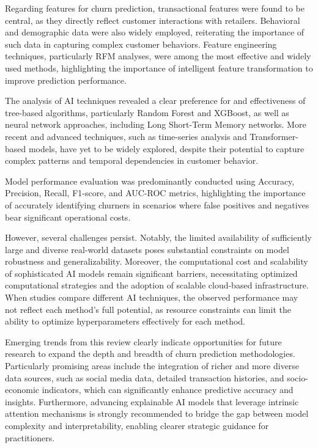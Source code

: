 \documentclass[preprint,12pt]{elsarticle}
\begin{document}
Regarding features for churn prediction, transactional features were found to be central, as they directly reflect customer interactions with retailers. Behavioral and demographic data were also widely employed, reiterating the importance of such data in capturing complex customer behaviors. Feature engineering techniques, particularly RFM analyses, were among the most effective and widely used methods, highlighting the importance of intelligent feature transformation to improve prediction performance.

The analysis of AI techniques revealed a clear preference for and effectiveness of tree-based algorithms, particularly Random Forest and XGBoost, as well as neural network approaches, including Long Short-Term Memory networks. More recent and advanced techniques, such as time-series analysis and Transformer-based models, have yet to be widely explored, despite their potential to capture complex patterns and temporal dependencies in customer behavior.

Model performance evaluation was predominantly conducted using Accuracy, Precision, Recall, F1-score, and AUC-ROC metrics, highlighting the importance of accurately identifying churners in scenarios where false positives and negatives bear significant operational costs. 

However, several challenges persist. Notably, the limited availability of sufficiently large and diverse real-world datasets poses substantial constraints on model robustness and generalizability. Moreover, the computational cost and scalability of sophisticated AI models remain significant barriers, necessitating optimized computational strategies and the adoption of scalable cloud-based infrastructure. When studies compare different AI techniques, the observed performance may not reflect each method's full potential, as resource constraints can limit the ability to optimize hyperparameters effectively for each method.

Emerging trends from this review clearly indicate opportunities for future research to expand the depth and breadth of churn prediction methodologies. Particularly promising areas include the integration of richer and more diverse data sources, such as social media %
data, detailed transaction histories, and socio-economic indicators, which can significantly enhance predictive accuracy and insights. Furthermore, advancing explainable AI models that leverage intrinsic attention mechanisms is strongly recommended to bridge the gap between model complexity and interpretability, enabling clearer strategic guidance for practitioners.
\end{document}
